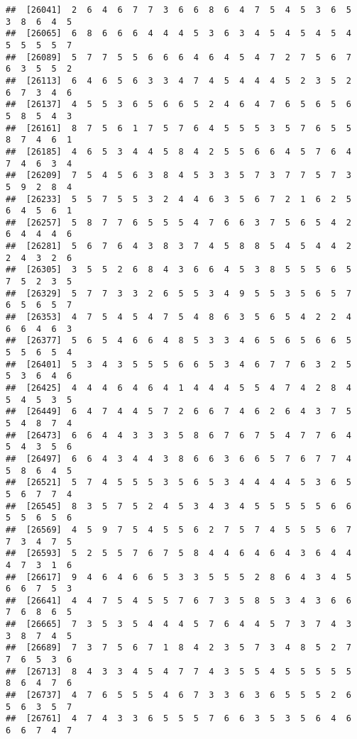 \documentclass[
]{book}
\begin{document}
\begin{verbatim}
##  [26041]  2  6  4  6  7  7  3  6  6  8  6  4  7  5  4  5  3  6  5  3  8  6  4  5
##  [26065]  6  8  6  6  6  4  4  4  5  3  6  3  4  5  4  5  4  5  4  5  5  5  5  7
##  [26089]  5  7  7  5  5  6  6  6  4  6  4  5  4  7  2  7  5  6  7  6  3  5  5  2
##  [26113]  6  4  6  5  6  3  3  4  7  4  5  4  4  4  5  2  3  5  2  6  7  3  4  6
##  [26137]  4  5  5  3  6  5  6  6  5  2  4  6  4  7  6  5  6  5  6  5  8  5  4  3
##  [26161]  8  7  5  6  1  7  5  7  6  4  5  5  5  3  5  7  6  5  5  8  7  4  6  1
##  [26185]  4  6  5  3  4  4  5  8  4  2  5  5  6  6  4  5  7  6  4  7  4  6  3  4
##  [26209]  7  5  4  5  6  3  8  4  5  3  3  5  7  3  7  7  5  7  3  5  9  2  8  4
##  [26233]  5  5  7  5  5  3  2  4  4  6  3  5  6  7  2  1  6  2  5  6  4  5  6  1
##  [26257]  5  8  7  7  6  5  5  5  4  7  6  6  3  7  5  6  5  4  2  6  4  4  4  6
##  [26281]  5  6  7  6  4  3  8  3  7  4  5  8  8  5  4  5  4  4  2  2  4  3  2  6
##  [26305]  3  5  5  2  6  8  4  3  6  6  4  5  3  8  5  5  5  6  5  7  5  2  3  5
##  [26329]  5  7  7  3  3  2  6  5  5  3  4  9  5  5  3  5  6  5  7  6  5  6  5  7
##  [26353]  4  7  5  4  5  4  7  5  4  8  6  3  5  6  5  4  2  2  4  6  6  4  6  3
##  [26377]  5  6  5  4  6  6  4  8  5  3  3  4  6  5  6  5  6  6  5  5  5  6  5  4
##  [26401]  5  3  4  3  5  5  5  6  6  5  3  4  6  7  7  6  3  2  5  5  3  6  4  6
##  [26425]  4  4  4  6  4  6  4  1  4  4  4  5  5  4  7  4  2  8  4  5  4  5  3  5
##  [26449]  6  4  7  4  4  5  7  2  6  6  7  4  6  2  6  4  3  7  5  5  4  8  7  4
##  [26473]  6  6  4  4  3  3  3  5  8  6  7  6  7  5  4  7  7  6  4  5  4  3  5  6
##  [26497]  6  6  4  3  4  4  3  8  6  6  3  6  6  5  7  6  7  7  4  5  8  6  4  5
##  [26521]  5  7  4  5  5  5  3  5  6  5  3  4  4  4  4  5  3  6  5  5  6  7  7  4
##  [26545]  8  3  5  7  5  2  4  5  3  4  3  4  5  5  5  5  5  6  6  5  5  6  5  6
##  [26569]  4  5  9  7  5  4  5  5  6  2  7  5  7  4  5  5  5  6  7  7  3  4  7  5
##  [26593]  5  2  5  5  7  6  7  5  8  4  4  6  4  6  4  3  6  4  4  4  7  3  1  6
##  [26617]  9  4  6  4  6  6  5  3  3  5  5  5  2  8  6  4  3  4  5  6  6  7  5  3
##  [26641]  4  4  7  5  4  5  5  7  6  7  3  5  8  5  3  4  3  6  6  7  6  8  6  5
##  [26665]  7  3  5  3  5  4  4  4  5  7  6  4  4  5  7  3  7  4  3  3  8  7  4  5
##  [26689]  7  3  7  5  6  7  1  8  4  2  3  5  7  3  4  8  5  2  7  7  6  5  3  6
##  [26713]  8  4  3  3  4  5  4  7  7  4  3  5  5  4  5  5  5  5  5  8  6  4  7  6
##  [26737]  4  7  6  5  5  5  4  6  7  3  3  6  3  6  5  5  5  2  6  5  6  3  5  7
##  [26761]  4  7  4  3  3  6  5  5  5  7  6  6  3  5  3  5  6  4  6  6  6  7  4  7

\end{verbatim}
\end{document}
